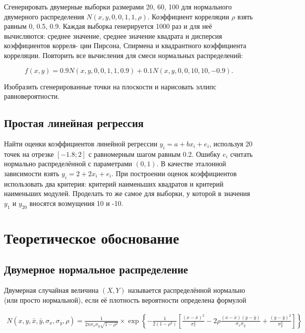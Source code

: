 \documentclass[12pt,a4paper]{article}
\begin{document}
	Сгенерировать двумерные выборки размерами 20, 60, 100 для нормального
	двумерного распределения \( N(x, y, 0, 0, 1, 1, \rho) \). Коэффициент
	корреляции \( \rho \) взять равным 0, 0.5, 0.9. Каждая выборка
	генерируется 1000 раз и для неё вычисляются: среднее значение, среднее
	значение квадрата и дисперсия коэффициентов корреля- ции Пирсона,
	Спирмена и квадрантного коэффициента корреляции. Повторить все
	вычисления для смеси нормальных распределений:

	\[
		f(x, y) = 0.9N(x, y, 0, 0, 1, 1, 0.9) + 0.1N(x, y, 0, 0, 10, 10, -0.9).
	\]

	Изобразить сгенерированные точки на плоскости и нарисовать эллипс
	равновероятности.

	\subsection{Простая линейная регрессия}

	Найти оценки коэффициентов линейной регрессии \( y_i = a + bx_i + e_i \),
	используя 20 точек на отрезке \( [-1.8; 2] \) с равномерным шагом равным
	0.2. Ошибку \( e_i \) считать нормально распределённой с параметрами
	\( (0, 1) \). В качестве эталонной зависимости взять
	\( y_i = 2 + 2x_i + e_i \). При построении оценок коэффициентов
	использовать два критерия: критерий наименьших квадратов и критерий
	наименьших модулей. Проделать то же самое для выборки, у которой в
	значения \( y_1 \) и \( y_{20} \) вносятся возмущения 10 и -10.

	\section{Теоретическое обоснование}

	\subsection{Двумерное нормальное распределение}

	Двумерная случайная величина \( (X, Y) \) называется распределённой
	нормально (или просто нормальной), если её плотность вероятности
	определена формулой

	\begin{align} \label{eq:multivariate_normal}
		N(x, y, \bar x, \bar y, \sigma_x, \sigma_y, \rho) = \frac{1}{2 \pi \sigma_x
		\sigma_y \sqrt{1 - \rho^2}} \times \exp \left \{ -\frac{1}{2(1 - \rho^2)}
		\left [ \frac{(x - \bar x)^2}{\sigma_x^2} - 2 \rho \frac{(x - \bar x)
		(y - \bar y)}{\sigma_x \sigma_y} + \frac{(y - \bar y)^2}{\sigma_y^2}
		\right ] \right \}
	\end{align}
\end{document}

